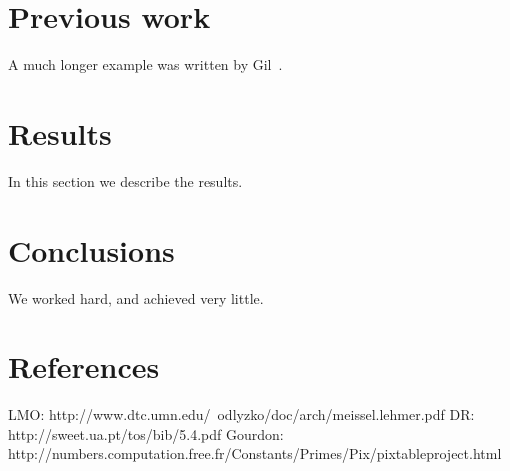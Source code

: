\documentclass[12pt]{article}
\begin{document}
\section{Previous work}\label{previous work}
A much longer \LaTeXe{} example was written by Gil~\cite{Gil:02}.

\section{Results}\label{results}
In this section we describe the results.

\section{Conclusions}\label{conclusions}
We worked hard, and achieved very little.

\section{References}
LMO: http://www.dtc.umn.edu/~odlyzko/doc/arch/meissel.lehmer.pdf
DR: http://sweet.ua.pt/tos/bib/5.4.pdf
Gourdon: http://numbers.computation.free.fr/Constants/Primes/Pix/pixtableproject.html
\end{document}
